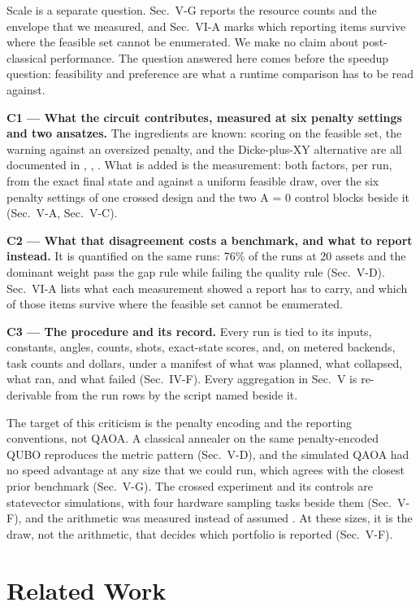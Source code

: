 \documentclass{ieeeaccess}
\begin{document}
Scale is a separate question. Sec.~V-G reports the resource counts and the envelope that we measured, and Sec.~VI-A marks which reporting items survive where the feasible set cannot be enumerated. We make no claim about post-classical performance. The question answered here comes before the speedup question: feasibility and preference are what a runtime comparison has to be read against.


\textbf{C1 --- What the circuit contributes, measured at six penalty settings and two ansatzes.} The ingredients are known: scoring on the feasible set, the warning against an oversized penalty, and the Dicke-plus-XY alternative are all documented in \cite{ref8}, \cite{ref11}, \cite{ref12}. What is added is the measurement: both factors, per run, from the exact final state and against a uniform feasible draw, over the six penalty settings of one crossed design and the two A = 0 control blocks beside it (Sec.~V-A, Sec.~V-C).


\textbf{C2 --- What that disagreement costs a benchmark, and what to report instead.} It is quantified on the same runs: 76\% of the runs at 20 assets and the dominant weight pass the gap rule while failing the quality rule (Sec.~V-D). Sec.~VI-A lists what each measurement showed a report has to carry, and which of those items survive where the feasible set cannot be enumerated.


\textbf{C3 --- The procedure and its record.} Every run is tied to its inputs, constants, angles, counts, shots, exact-state scores, and, on metered backends, task counts and dollars, under a manifest of what was planned, what collapsed, what ran, and what failed (Sec.~IV-F). Every aggregation in Sec.~V is re-derivable from the run rows by the script named beside it.


The target of this criticism is the penalty encoding and the reporting conventions, not QAOA. A classical annealer on the same penalty-encoded QUBO reproduces the metric pattern (Sec.~V-D), and the simulated QAOA had no speed advantage at any size that we could run, which agrees with the closest prior benchmark \cite{ref13} (Sec.~V-G). The crossed experiment and its controls are statevector simulations, with four hardware sampling tasks beside them (Sec.~V-F), and the arithmetic was measured instead of assumed \cite{ref14}. At these sizes, it is the draw, not the arithmetic, that decides which portfolio is reported (Sec.~V-F).


\section{Related Work}
\end{document}
